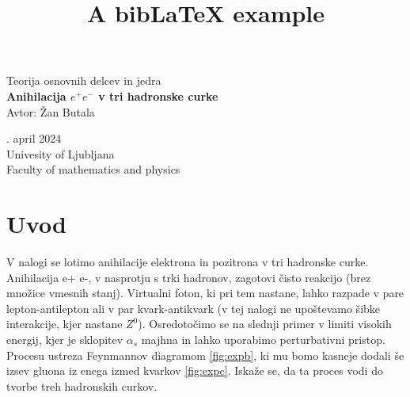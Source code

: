 \documentclass[11pt]{article}
\title{A bibLaTeX example}
\begin{document}
\begin{titlepage}
\begin{center}
	
	{\sc\Large	Teorija osnovnih delcev in jedra}\\
	\vspace*{5cm}
	\LARGE\textbf{Anihilacija $e^+ e^-$ v tri hadronske curke}\\
	\vspace{0.2cm}
	\vspace{1.6cm}
	\large{Avtor: Žan Butala}\\
 

       \vspace{5cm}


       \vfill

	\normalsize
 
       {. april 2024\\
	\vspace{0.2cm}
       Univesity of Ljubljana\\
       Faculty of mathematics and physics\\}
      
\end{center}
\end{titlepage}


\newpage

\tableofcontents







\vspace*{0.5cm}
\section{Uvod}

V nalogi se lotimo anihilacije elektrona in pozitrona v tri hadronske curke.
Anihilacija e+ e-, v nasprotju s trki hadronov, zagotovi čisto reakcijo (brez množice vmesnih stanj).
Virtualni foton, ki pri tem nastane, lahko razpade v pare lepton-antilepton ali v par kvark-antikvark
(v tej nalogi ne upoštevamo šibke interakcije, kjer nastane $Z^0$).
Osredotočimo se na slednji primer v limiti visokih energij, kjer je sklopitev $\alpha_s$ majhna in lahko uporabimo perturbativni pristop.
Procesu ustreza Feynmannov diagramom \ref*{fig:expb}, 
ki mu bomo kasneje dodali še izsev gluona iz enega izmed kvarkov \ref*{fig:expc}.
Iskaže se, da ta proces vodi do tvorbe treh hadronskih curkov.
\end{document}
